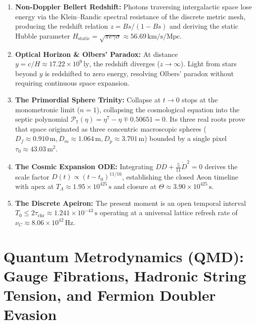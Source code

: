 \documentclass[
    12pt,
    a4paper,
    headings=normal,
    twoside=false,
    open=any,
    parskip=half
]{scrbook}
\begin{document}
\begin{tcolorbox}[colback=maincolor!3!white, colframe=maincolor!80!black, title={\textbf{Grand Synthesis of Chapter 7}}]
\begin{enumerate}[leftmargin=1.5em, itemsep=5pt]
    \item \textbf{Non-Doppler Bellert Redshift:} Photons traversing intergalactic space lose energy via the Klein--Randic spectral resistance of the discrete metric mesh, producing the redshift relation $z = Bs / (1 - Bs)$ and deriving the static Hubble parameter $H_{\text{static}} = \sqrt{\pi e \gamma \sigma} \approx 56.69\,\text{km/s/Mpc}$.
    \item \textbf{Optical Horizon \& Olbers' Paradox:} At distance $y = c/H \approx 17.22 \times 10^9\,\text{ly}$, the redshift diverges ($z \to \infty$). Light from stars beyond $y$ is redshifted to zero energy, resolving Olbers' paradox without requiring continuous space expansion.
    \item \textbf{The Primordial Sphere Trinity:} Collapse at $t \to 0$ stops at the monometronic limit ($n = 1$), collapsing the cosmological equation into the septic polynomial $\mathcal{P}_7(\eta) = \eta^7 - \eta \mp 0.50651 = 0$. Its three real roots prove that space originated as three concentric macroscopic spheres ($D_f \approx 0.910\,\text{m}, D_m \approx 1.064\,\text{m}, D_p \approx 3.701\,\text{m}$) bounded by a single pixel $\tau_0 \approx 43.03\,\text{m}^2$.
    \item \textbf{The Cosmic Expansion ODE:} Integrating $D\ddot{D} + \frac{5}{11}\dot{D}^2 = 0$ derives the scale factor $D(t) \propto (t - t_0)^{11/16}$, establishing the closed Aeon timeline with apex at $T_\Lambda \approx 1.95 \times 10^{425}\,\text{s}$ and closure at $\Theta \approx 3.90 \times 10^{425}\,\text{s}$.
    \item \textbf{The Discrete Apeiron:} The present moment is an open temporal interval $T_0 \le 2\tau_{\text{chr}} \approx 1.241 \times 10^{-43}\,\text{s}$ operating at a universal lattice refresh rate of $\nu_C \approx 8.06 \times 10^{42}\,\text{Hz}$.
\end{enumerate}
\end{tcolorbox}

\chapter{Quantum Metrodynamics (QMD): Gauge Fibrations, Hadronic String Tension, and Fermion Doubler Evasion}
\label{chap:ch8_expanded}
\end{document}
